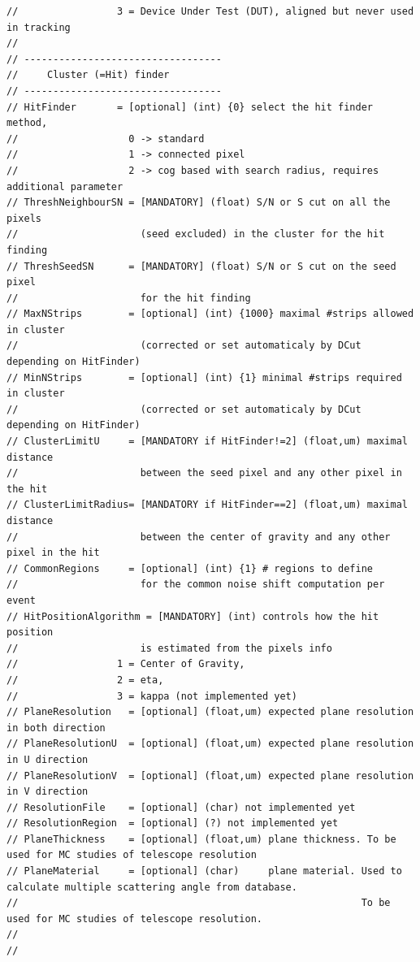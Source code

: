 \documentclass[a4paper, 12pt, twoside]{article}
\begin{document}
\begin{verbatim}
//                 3 = Device Under Test (DUT), aligned but never used in tracking
//
// ----------------------------------
//     Cluster (=Hit) finder
// ----------------------------------
// HitFinder       = [optional] (int) {0} select the hit finder method,
//                   0 -> standard
//                   1 -> connected pixel
//                   2 -> cog based with search radius, requires additional parameter
// ThreshNeighbourSN = [MANDATORY] (float) S/N or S cut on all the pixels
//                     (seed excluded) in the cluster for the hit finding
// ThreshSeedSN      = [MANDATORY] (float) S/N or S cut on the seed pixel
//                     for the hit finding
// MaxNStrips        = [optional] (int) {1000} maximal #strips allowed in cluster
//                     (corrected or set automaticaly by DCut depending on HitFinder)
// MinNStrips        = [optional] (int) {1} minimal #strips required in cluster
//                     (corrected or set automaticaly by DCut depending on HitFinder)
// ClusterLimitU     = [MANDATORY if HitFinder!=2] (float,um) maximal distance
//                     between the seed pixel and any other pixel in the hit
// ClusterLimitRadius= [MANDATORY if HitFinder==2] (float,um) maximal distance
//                     between the center of gravity and any other pixel in the hit
// CommonRegions     = [optional] (int) {1} # regions to define
//                     for the common noise shift computation per event
// HitPositionAlgorithm = [MANDATORY] (int) controls how the hit position
//                     is estimated from the pixels info
//                 1 = Center of Gravity,
//                 2 = eta,
//                 3 = kappa (not implemented yet)
// PlaneResolution   = [optional] (float,um) expected plane resolution in both direction
// PlaneResolutionU  = [optional] (float,um) expected plane resolution in U direction
// PlaneResolutionV  = [optional] (float,um) expected plane resolution in V direction
// ResolutionFile    = [optional] (char) not implemented yet
// ResolutionRegion  = [optional] (?) not implemented yet
// PlaneThickness    = [optional] (float,um) plane thickness. To be used for MC studies of telescope resolution
// PlaneMaterial     = [optional] (char)     plane material. Used to calculate multiple scattering angle from database.
//                                                           To be used for MC studies of telescope resolution.
//
//



\end{verbatim}
\end{document}
